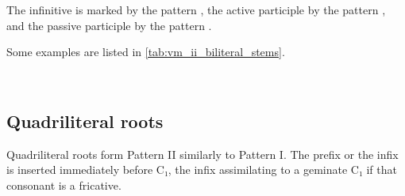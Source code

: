 \documentclass[grammar]{subfiles}
\begin{document}
The infinitive is marked by the pattern , the active participle by the
pattern , and the passive participle by the pattern .  

Some examples are listed in \cref{tab:vm_ii_biliteral_stems}. 

\begin{table}[h!]\small\capstart
  \centering
  \\
  \caption{Pattern II biliteral stems \label{tab:vm_ii_biliteral_stems}}
\end{table}


\subsection{Quadriliteral roots}
\label{ssec:vm_ii_quadriliteral_roots}

Quadriliteral roots form Pattern II similarly to Pattern I. The prefix
 or the infix  is inserted immediately before C₁, the infix
assimilating to a geminate C₁ if that consonant is a fricative. 
\end{document}

